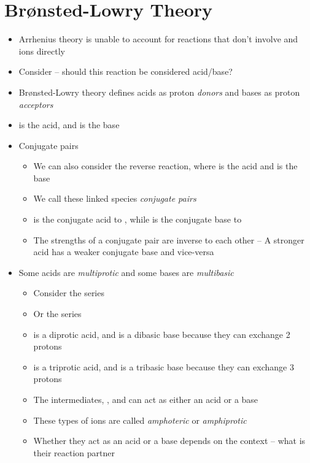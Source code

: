 \documentclass[12pt, openany, letterpaper]{memoir}
\begin{document}
\section{Br\o nsted-Lowry Theory}
\begin{itemize}
	\item Arrhenius theory is unable to account for reactions that don't involve  and  ions directly
	\item Consider  -- should this reaction be considered acid/base?
	\item Br\o nsted-Lowry theory defines acids as proton \emph{donors} and bases as proton \emph{acceptors}
	\item {} is the acid, and  is the base
	\item Conjugate pairs
	\begin{itemize}
		\item We can also consider the reverse reaction, where  is the acid and  is the base
		\item We call these linked species \emph{conjugate pairs}
		\item {} is the conjugate acid to , while  is the conjugate base to 
		\item The strengths of a conjugate pair are inverse to each other -- A stronger acid has a weaker conjugate base and vice-versa
	\end{itemize}
	\item Some acids are \emph{multiprotic} and some bases are \emph{multibasic}
	\begin{itemize}
		\item Consider the series  
		\item Or the series 
		\item {} is a diprotic acid, and  is a dibasic base because they can exchange 2 protons
		\item {} is a triprotic acid, and  is a tribasic base because they can exchange 3 protons
		\item The intermediates, ,  and  can act as either an acid or a base
		\item These types of ions are called \emph{amphoteric} or \emph{amphiprotic}
		\item Whether they act as an acid or a base depends on the context -- what is their reaction partner
	\end{itemize}
\end{itemize}
\end{document}
